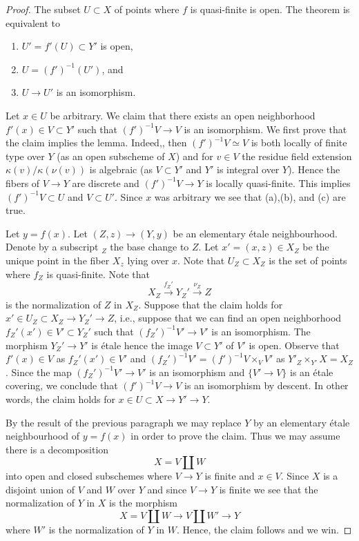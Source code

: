\documentclass{article}
\begin{document}
\begin{proof}
    The subset $U \subset X$ of points where $f$ is quasi-finite is open. The theorem is equivalent to
    \begin{enumerate}[label=(\alph*)]
        \item $U' = f'(U) \subset Y'$ is open,
        \item $U = (f')^{-1}(U')$, and
        \item $U \to U'$ is an isomorphism.
    \end{enumerate}

    Let $x \in U$ be arbitrary. We claim that there exists an open neighborhood $f'(x) \in V \subset Y'$ such that $(f')^{-1}V \to V$ is an isomorphism. We first prove that the claim implies the lemma. Indeed,, then $(f')^{-1}V \simeq V$ is both locally of finite type over $Y$ (as an open subscheme of $X$) and for $v \in V$ the residue field extension $\kappa(v)/\kappa(\nu(v))$ is algebraic (as $V \subset Y'$ and $Y'$ is integral over $Y$). Hence the fibers of $V \to Y$ are discrete and $(f')^{-1}V \to Y$ is locally quasi-finite. This implies $(f')^{-1}V \subset U$ and $V \subset U'$. Since $x$ was arbitrary we see that (a),(b), and (c) are true.

    Let $y = f(x)$. Let $(Z,z) \to (Y,y)$ be an elementary étale neighbourhood. Denote by a subscript $_Z$ the base change to $Z$. Let $x'=(x,z) \in X_Z$ be the unique point in the fiber $X_z$ lying over $x$. Note that $U_Z \subset X_Z$ is the set of points where $f_Z$ is quasi-finite. Note that
    \[
        X_Z \xrightarrow{f_Z'} Y_Z' \xrightarrow{\nu_Z} Z 
    \]
    is the normalization of $Z$ in $X_Z$. Suppose that the claim holds for $x' \in U_Z \subset X_Z \to Y_Z' \to Z$, i.e., suppose that we can find an open neighborhood $f_Z'(x') \in V' \subset Y_Z'$ such that $(f_Z')^{-1}V' \to V'$ is an isomorphism. The morphism $Y_Z' \to Y'$ is étale hence the image $V \subset Y'$ of $V'$ is open. Observe that $f'(x) \in V$ as $f_Z'(x') \in V'$ and $(f_Z')^{-1}V' = (f')^{-1}V \times_V V'$ as $Y'_Z \times_{Y'} X = X_Z$. Since the map $(f_Z')^{-1}V' \to V'$ is an isomorphism and $\{V' \to V\}$ is an étale covering, we conclude that $(f')^{-1}V \to V$ is an isomorphism by descent. In other words, the claim holds for $x \in U \subset X \to Y' \to Y$.

    By the result of the previous paragraph we may replace $Y$ by an elementary étale neighbourhood of $y = f(x)$ in order to prove the claim. Thus we may assume there is a decomposition
    \[
        X = V \coprod W
    \]
    into open and closed subschemes where $V \to Y$ is finite and $x \in V$. Since $X$ is a disjoint union of $V$ and $W$ over $Y$ and since $V \to Y$ is finite we see that the normalization of $Y$ in $X$ is the morphism
    \[
        X = V \coprod W \to V \coprod W' \to Y
    \]
    where $W'$ is the normalization of $Y$ in $W$. Hence, the claim follows and we win. 
 \end{proof}
\end{document}
